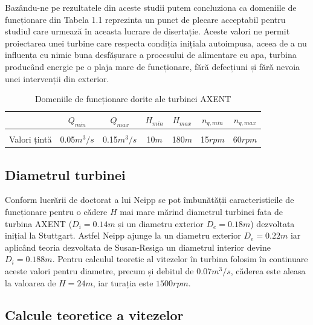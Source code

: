Bazându-ne pe rezultatele din aceste studii putem concluziona ca domeniile de funcționare din Tabela 1.1 reprezinta un punct de plecare acceptabil pentru studiul care urmează în aceasta lucrare de disertație. Aceste valori ne permit proiectarea unei turbine care respecta condiția inițiala autoimpusa, aceea de a nu influența cu nimic buna desfășurare a procesului de alimentare cu apa, turbina producând energie pe o plaja mare de funcționare, fără defecțiuni și fără nevoia unei intervenții din exterior.\\

\begin{table}[ht]
\caption{Domeniile de funcționare dorite ale turbinei AXENT \cite{neipp2017zweistufige}}%
\centering

\begin{tabular}{ c | c | c | c | c | c | c }
           & $Q_{min}$          & $Q_{max}$          & $H_{min}$    & $H_{max}$     & $n_{q,min}$        & $n_{q,max}$ \\ \hline
&&&&&&\\[-0.5em]
Valori țintă  & 0.05$\si{m^3/s}$ & 0.15$\si{m^3/s}$ & 10$\si{m}$ & 180$\si{m}$ & 15$\si{rpm}$ & 60$\si{rpm}$ \\
\end{tabular}

\end{table}


\subsection{Diametrul turbinei}

Conform lucrării de doctorat a lui Neipp \cite{neipp2017zweistufige} se pot îmbunătății caracteristicile de funcționare pentru o cădere $H$ mai mare mărind diametrul turbinei fata de turbina AXENT ($D_i = 0.14\si{m}$ și un diametru exterior $D_e = 0.18\si{m}$) dezvoltata inițial la Stuttgart. Astfel Neipp ajunge la un diametru exterior $D_e = 0.22\si{m}$ iar aplicând teoria dezvoltata de Susan-Resiga \cite{susanhub} un diametrul interior devine $D_i = 0.188\si{m}$. Pentru calculul teoretic al vitezelor în turbina folosim în continuare aceste valori pentru diametre, precum și debitul de $0.07\si{m^3/s}$, căderea este aleasa la valoarea de $H=24\si{m}$, iar turația este $1500\si{rpm}$.

\clearpage

\subsection{Calcule teoretice a vitezelor}

